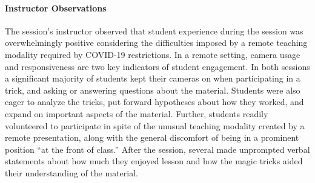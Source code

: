 \paragraph{Instructor Observations}
The session's instructor observed that student experience during
the session was overwhelmingly positive considering
the difficulties imposed by a remote teaching modality required by COVID-19
restrictions.
In a remote setting, camera usage
and responsiveness are two key indicators of student engagement.
In both sessions a significant majority of students kept their cameras on
when participating in a trick, and asking or answering questions
about the material.
Students were also
eager to analyze the
tricks, put forward hypotheses about how they worked,
and expand on important aspects of the material.
Further, students readily volunteered to participate in spite
of the unusual teaching modality created by a remote presentation,
along with the general discomfort of being in a
prominent position ``at the front of class.''
After the session,
several
made
unprompted verbal statements about how much they enjoyed
lesson and how the magic tricks aided their understanding of the
material.
